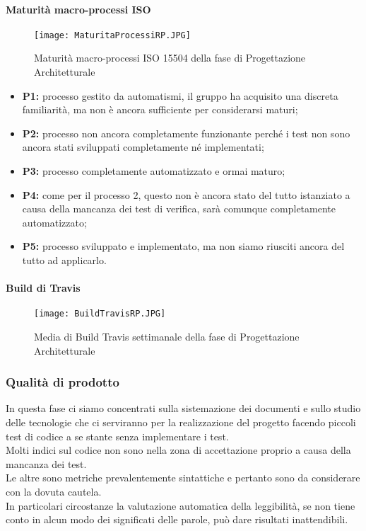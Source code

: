 \paragraph{Maturità macro-processi ISO }
\hspace{15cm}
\begin{figure}[!htbp]
	\centering
	\texttt{[image: MaturitaProcessiRP.JPG]}
	\caption{Maturità macro-processi ISO 15504 della fase di Progettazione Architetturale }
\end{figure}
\begin{itemize}
	\item \textbf{P1:} processo gestito da automatismi, il gruppo ha acquisito una discreta familiarità, ma non è ancora sufficiente per considerarsi maturi;   
	\item \textbf{P2:} processo non ancora completamente funzionante perché i test non sono ancora stati sviluppati completamente né implementati;
	\item \textbf{P3:} processo completamente automatizzato e ormai maturo;
	\item \textbf{P4:} come per il processo 2, questo non è ancora stato del tutto istanziato a causa della mancanza dei test di verifica, sarà comunque completamente automatizzato;
	\item \textbf{P5:} processo sviluppato e implementato, ma non siamo riusciti ancora del tutto ad applicarlo.
\end{itemize}
\newpage
\paragraph{Build di Travis}
\hspace{15cm}
\begin{figure}[!htbp]
	\centering
	\texttt{[image: BuildTravisRP.JPG]}
	\caption{Media di Build Travis settimanale della fase di Progettazione Architetturale}
\end{figure}
    
\subsubsection{Qualità di prodotto}
In questa fase ci siamo concentrati sulla sistemazione dei documenti e sullo studio delle tecnologie che ci serviranno per la realizzazione del progetto facendo piccoli test di codice a se stante senza implementare i test.\\
Molti indici sul codice non sono nella zona di accettazione proprio a causa della mancanza dei test.\\
Le altre sono metriche prevalentemente sintattiche e pertanto sono da considerare con la dovuta cautela. \\
In particolari circostanze la valutazione automatica della leggibilità, se non tiene conto in alcun modo dei significati delle parole, può dare risultati inattendibili. 
